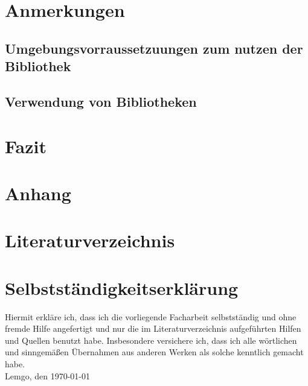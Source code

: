 \documentclass[a4paper,12pt,titlepage,ngerman]{article}
\begin{document}
\begin{sloppypar}
  \section{Anmerkungen}\label{sec:AdditionalNotes}
  \subsection{Umgebungsvorraussetzuungen zum nutzen der Bibliothek}\label{subsec:SystemRequirements}
  \subsection{Verwendung von Bibliotheken}\label{subsec:UsageOfLibraries}
  \section{Fazit}\label{sec:Conclusion}
  \section{Anhang}\label{sec:anhang}
  \section{Literaturverzeichnis}\label{sec:Literature}
  \section{Selbstständigkeitserklärung}\label{sec:IDidThisMyself}
  Hiermit erkläre ich, dass ich die vorliegende Facharbeit selbstständig und ohne fremde Hilfe angefertigt und nur die im Literaturverzeichnis 
  aufgeführten Hilfen und Quellen benutzt habe.
  Insbesondere versichere ich, dass ich alle wörtlichen
  und sinngemä\ss en Übernahmen aus anderen Werken als solche kenntlich gemacht habe.
  \\
  \linebreak
  Lemgo, den \today
 \end{sloppypar}
\end{document}
